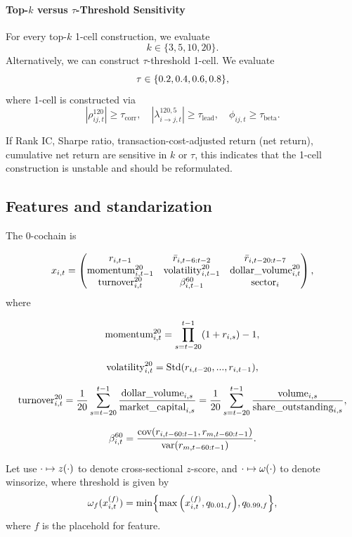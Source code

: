 \documentclass[11pt]{article}
\begin{document}
\paragraph{Top-$k$ versus $\tau$-Threshold Sensitivity}
For every top-$k$ 1-cell construction, we evaluate
\[
    k \in \{3,5,10,20\}.
\]
Alternatively, we can construct $\tau$-threshold 1-cell. We evaluate \[\tau \in \st{0.2,0.4,0.6,0.8},\] where 1-cell is constructed via \[|\rho_{ij,t}^{120}|\ge \tau_{\mathrm{corr}},\quad|\lambda_{i\to j,t}^{120,5}|\ge \tau_{\mathrm{lead}},\quad\phi_{ij,t}\ge \tau_{\mathrm{beta}}.\]

If Rank IC, Sharpe ratio, transaction-cost-adjusted return (net return), cumulative net return are  sensitive in $k$ or $\tau$, this indicates that the 1-cell construction is unstable and should be reformulated. 




\subsection{Features and standarization}
The 0-cochain  is

\[x_{i,t} = \begin{pmatrix}
    r_{i,t-1}& \bar r_{i,t-6:t-2}&\bar r_{i,t-20:t-7}\\
    \operatorname{momentum}_{i,t-1}^{20}& \operatorname{volatility}_{i,t-1}^{20}& \operatorname{dollar\_volume}_{i,t}^{20}\\
    \operatorname{turnover}_{i,t}^{20}&\beta_{i,t-1}^{60}&\operatorname{sector}_i
\end{pmatrix},\] where 

\[
\text{momentum}_{i,t}^{20} = \prod_{s= t-20}^{t-1} (1+ r_{i,s}) -1,
\]

\[\text{volatility}_{i,t}^{20} =\text{Std}{\left\lparen r_{i,t-20},..., r_{i,t-1}\right\rparen},\]

\[\text{turnover}_{i,t}^{20} = \frac{1}{20} \sum_{s=t-20}^{t-1}\frac{\text{dollar\_volume}_{i,s}}{\text{market\_capital}_{i,s}}=\frac{1}{20} \sum_{s=t-20}^{t-1}\frac{\text{volume}_{i,s}}{\text{share\_outstanding}_{i,s}},\] 

\[\beta_{i,t}^{60} = \frac{\text{cov}{\left\lparen r_{i,t-60:t-1}, r_{m,t-60:t-1}\right\rparen}}{\text{var}{\left\lparen r_{m,t-60:t-1}\right\rparen}}.\]





Let use $\cdot \mapsto z{\left\lparen\cdot\right\rparen}$ to denote cross-sectional $z$-score, and $\cdot \mapsto \omega{\left\lparen\cdot\right\rparen}$ to denote winsorize, where threshold is given by \[\omega_f(x^\pa{f}_{i,t}) = \min\st{\max\pa{x_{i,t}^\pa{f},q_{0.01,f}},q_{0.99,f}},\] where $f$ is the placehold for feature. 
\end{document}
